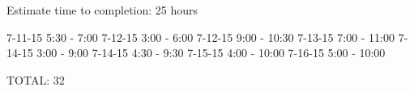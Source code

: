Estimate time to completion\-: 25 hours

7-\/11-\/15 5\-:30 -\/ 7\-:00 7-\/12-\/15 3\-:00 -\/ 6\-:00 7-\/12-\/15 9\-:00 -\/ 10\-:30 7-\/13-\/15 7\-:00 -\/ 11\-:00 7-\/14-\/15 3\-:00 -\/ 9\-:00 7-\/14-\/15 4\-:30 -\/ 9\-:30 7-\/15-\/15 4\-:00 -\/ 10\-:00 7-\/16-\/15 5\-:00 -\/ 10\-:00

T\-O\-T\-A\-L\-: 32 